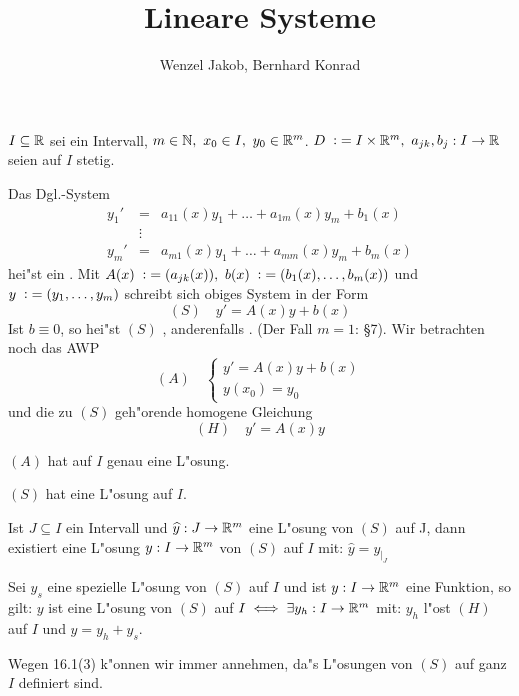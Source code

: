 \documentclass{article}
\title{Lineare Systeme}
\author{Wenzel Jakob, Bernhard Konrad}
\begin{document}
\maketitle

\begin{vereinbarung}
$I\subseteq\mathbb{R}$ sei ein Intervall, $m\in\mathbb{N},\ x_0\in I,\ y_0\in\mathbb{R}^m$.
$D\da I\times\MdR^m,\ a_{jk}, b_j:I\to\MdR$ seien auf $I$ stetig.
\end{vereinbarung}

Das Dgl.-System
\begin{eqnarray*}
y_1'&=&a_{11}(x)y_1 + \ldots + a_{1m}(x)y_m + b_1(x)\\
&\vdots &\\
y_m'&=&a_{m1}(x)y_1 + \ldots + a_{mm}(x)y_m + b_m(x)
\end{eqnarray*}
hei"st ein . Mit $A(x)\da (a_{jk}(x)),\ b(x)\da (b_1(x),\ldots,b_m(x))$ und $y\da (y_1, \ldots, y_m)$
schreibt sich obiges System in der Form
\[
	(S)\quad y'=A(x)y+b(x)
\]
Ist $b\equiv 0$, so hei"st $(S)$ , anderenfalls . (Der Fall $m=1$: §7).
Wir betrachten noch das AWP
\[
	(A)\quad \begin{cases}
		y'=A(x)y+b(x)\\
		y(x_0)=y_0
	\end{cases}
\]
und die zu $(S)$ geh"orende homogene Gleichung
\[
	(H)\quad y'=A(x)y
\]

\begin{satz}
\begin{liste}
\item $(A)$ hat auf $I$ genau eine L"osung.
\item $(S)$ hat eine L"osung auf $I$.
\item Ist $J\subseteq I$ ein Intervall und $\widehat{y}:J\to\mathbb{R}^m$ eine L"osung von $(S)$ auf J, dann existiert eine L"osung $y:I\to\mathbb{R}^m$ von $(S)$ auf $I$ mit: $\widehat{y}=y_{|_J}$
\item Sei $y_s$ eine spezielle L"osung von $(S)$ auf $I$ und ist $y:I\to\mathbb{R}^m$ eine Funktion, so gilt: $y$ ist eine L"osung von $(S)$ auf $I\iff \exists y_h:I\to\mathbb{R}^m$ mit:
$y_h$ l"ost $(H)$ auf $I$ und $y=y_h+y_s$.
\end{liste}
\end{satz}

\begin{wichtigebemerkung}	
Wegen 16.1(3) k"onnen wir immer annehmen, da"s L"osungen von $(S)$ auf ganz $I$ definiert sind.
\end{wichtigebemerkung}
\end{document}
